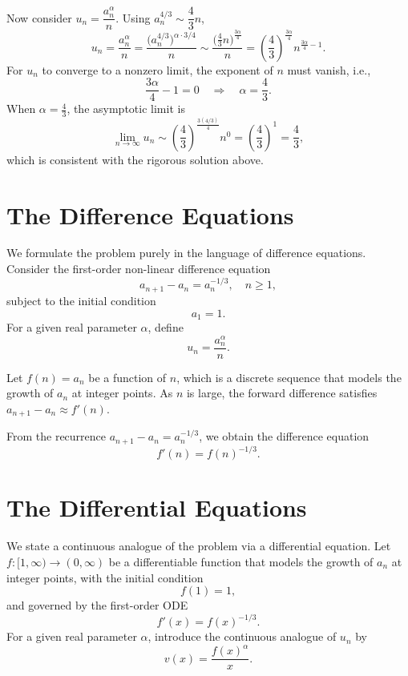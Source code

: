 \documentclass{article}
\begin{document}
Now consider $u_n = \dfrac{a_n^{\alpha}}{n}$. Using $a_n^{4/3} \sim \dfrac{4}{3}n$,
$$ u_n = \frac{a_n^{\alpha}}{n} = \frac{\big(a_n^{4/3}\big)^{\alpha\cdot 3/4}}{n}
\sim \frac{\big(\tfrac{4}{3}n\big)^{\frac{3\alpha}{4}}}{n}
= \left(\frac{4}{3}\right)^{\frac{3\alpha}{4}} n^{\frac{3\alpha}{4}-1}. $$
For $u_n$ to converge to a nonzero limit, the exponent of $n$ must vanish, i.e.,
$$ \frac{3\alpha}{4} - 1 = 0 \quad \Longrightarrow \quad \alpha = \frac{4}{3}. $$
When $\alpha = \tfrac{4}{3}$, the asymptotic limit is
$$ \lim_{n\to\infty} u_n \sim \left(\frac{4}{3}\right)^{\frac{3(4/3)}{4}} n^{0} = \left(\frac{4}{3}\right)^{1} = \frac{4}{3}, $$
which is consistent with the rigorous solution above.

\section{The Difference Equations}
We formulate the problem purely in the language of difference equations. 
Consider the first-order non-linear difference equation
$$ a_{n+1} - a_n = a_n^{-1/3}, \quad n \ge 1, $$
subject to the initial condition
$$ a_1 = 1. $$
For a given real parameter $\alpha$, define
$$ u_n = \frac{a_n^\alpha}{n}. $$

Let $f(n) = a_n$ be a function of $n$, which is a discrete sequence that models the growth of $a_n$ at integer points.
As $n$ is large, the forward difference satisfies $a_{n+1} - a_n \approx f'(n)$.

From the recurrence $a_{n+1} - a_n = a_n^{-1/3}$, we obtain the difference equation
$$ f'(n) = f(n)^{-1/3}. $$

\section{The Differential Equations}
We state a continuous analogue of the problem via a differential equation. Let $f\colon [1,\infty) \to (0,\infty)$ be a differentiable function that models the growth of $a_n$ at integer points, with the initial condition
$$ f(1) = 1, $$
and governed by the first-order ODE
$$ f'(x) = f(x)^{-1/3}. $$
For a given real parameter $\alpha$, introduce the continuous analogue of $u_n$ by
$$ v(x) = \frac{f(x)^\alpha}{x}. $$
\end{document}

